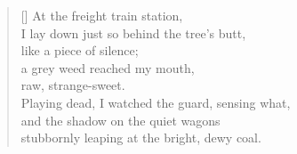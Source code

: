 \documentclass[a4paper,12pt,twoside,final]{book}
\begin{document}
\settowidth{\versewidth}{stubbornly leaping at the bright, dewy coal.}

\begin{verse}[\versewidth]
  At the freight train station, \\
  I lay down just so behind the tree's butt, \\
  like a piece of silence; \\
  a grey weed reached my mouth, \\
  raw, strange-sweet. \\
  Playing dead, I watched the guard, sensing what, \\
  and the shadow on the quiet wagons \\
  stubbornly leaping at the bright, dewy coal.
\end{verse}

\newpage

\settowidth{\versewidth}{Csak ami nincs, annak van bokra,}
\end{document}
